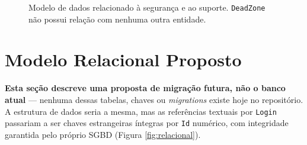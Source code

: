 \begin{figure}[htbp]
  \centering
  \caption{Modelo de dados relacionado à segurança e ao suporte. \texttt{DeadZone} não possui
  relação com nenhuma outra entidade.}
  \label{fig:seguranca}
\end{figure}

\section{Modelo Relacional Proposto}
\label{sec:proposto}

\textbf{Esta seção descreve uma proposta de migração futura, não o banco atual} — nenhuma dessas
tabelas, chaves ou \textit{migrations} existe hoje no repositório. A estrutura de dados seria a
mesma, mas as referências textuais por \texttt{Login} passariam a ser chaves estrangeiras
íntegras por \texttt{Id} numérico, com integridade garantida pelo próprio SGBD (Figura
\ref{fig:relacional}).

